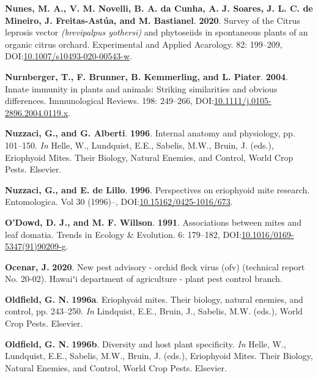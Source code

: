 \documentclass[12pt,final,CPage]{ufthesis}
\newlength{\cslhangindent}
\newenvironment{CSLReferences}[2] %
{%
	\setlength{\parindent}{0pt}
	\ifodd #1 \everypar{\setlength{\hangindent}{\cslhangindent}}\ignorespaces\fi
	\ifnum #2 > 0
	\setlength{\parskip}{#2\baselineskip}
	\fi
}%
{}
\begin{document}
{\begin{CSLReferences}{1}{0}
  \leavevmode{}%
  \textbf{Nunes, M. A., V. M. Novelli, B. A. da Cunha, A. J. Soares, J. L. C. de Mineiro, J. Freitas-Astúa, and M. Bastianel}. \textbf{2020}. Survey of the {Citrus leprosis} vector \emph{(brevipalpus yothersi)} and phytoseiids in spontaneous plants of an organic citrus orchard. Experimental and Applied Acarology. 82: 199--209, DOI:\href{https://doi.org/10.1007/s10493-020-00543-w}{10.1007/s10493-020-00543-w}.

  \leavevmode{}%
  \textbf{Nurnberger, T., F. Brunner, B. Kemmerling, and L. Piater}. \textbf{2004}. Innate immunity in plants and animals: Striking similarities and obvious differences. Immunological Reviews. 198: 249--266, DOI:\href{https://doi.org/10.1111/j.0105-2896.2004.0119.x}{10.1111/j.0105-2896.2004.0119.x}.

  \leavevmode{}%
  \textbf{Nuzzaci, G., and G. Alberti}. \textbf{1996}. Internal anatomy and physiology, pp. 101--150. \emph{In} Helle, W., Lundquist, E.E., Sabelis, M.W., Bruin, J. (eds.), Eriophyoid Mites. Their Biology, Natural Enemies, and Control, World Crop Pests. Elsevier.

  \leavevmode{}%
  \textbf{Nuzzaci, G., and E. de Lillo}. \textbf{1996}. Perspectives on eriophyoid mite research. Entomologica. Vol 30 (1996)--, DOI:\href{https://doi.org/10.15162/0425-1016/673}{10.15162/0425-1016/673}.

  \leavevmode{}%
  \textbf{O'Dowd, D. J., and M. F. Willson}. \textbf{1991}. Associations between mites and leaf domatia. Trends in Ecology {\&} Evolution. 6: 179--182, DOI:\href{https://doi.org/10.1016/0169-5347(91)90209-g}{10.1016/0169-5347(91)90209-g}.

  \leavevmode{}%
  \textbf{Ocenar, J.} \textbf{2020}. New pest advisory - orchid fleck virus (ofv) (technical report No. 20-02). Hawaiʻi department of agriculture - plant pest control branch.

  \leavevmode{}%
  \textbf{Oldfield, G. N.} \textbf{1996a}. Eriophyoid mites. Their biology, natural enemies, and control, pp. 243--250. \emph{In} Lindquist, E.E., Bruin, J., Sabelis, M.W. (eds.), World Crop Pests. Elsevier.

  \leavevmode{}%
  \textbf{Oldfield, G. N.} \textbf{1996b}. Diversity and host plant specificity. \emph{In} Helle, W., Lundquist, E.E., Sabelis, M.W., Bruin, J. (eds.), Eriophyoid Mites. Their Biology, Natural Enemies, and Control, World Crop Pests. Elsevier.


\end{CSLReferences}}
\end{document}
